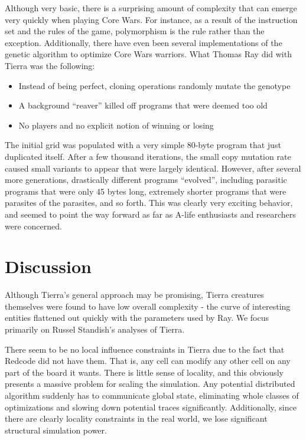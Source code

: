 \documentclass[11pt, twocolumn]{article}
\begin{document}
	Although very basic, there is a surprising amount of complexity that can emerge very quickly when playing Core Wars. For instance, as a result of the instruction set and the rules of the game, polymorphism is the rule rather than the exception. Additionally, there have even been several implementations of the genetic algorithm to optimize Core Wars warriors. What Thomas Ray did with Tierra \cite{OnTierra} was the following: 

\begin{itemize}
\item Instead of being perfect, cloning operations randomly mutate the genotype
\item A background ``reaver'' killed off programs that were deemed too old
\item No players and no explicit notion of winning or losing
\end{itemize}

The initial grid was populated with a very simple 80-byte program that just duplicated itself. After a few thousand iterations, the small copy mutation rate caused small variants to appear that were largely identical.
However, after several more generations, drastically different programs ``evolved'', including parasitic programs that were only 45 bytes long, extremely shorter programs that were parasites of the parasites, and so forth. This was clearly very exciting behavior, and seemed to point the way forward as far as A-life enthusiasts and researchers were concerned.

\section{Discussion}
Although Tierra's general approach may be promising, Tierra creatures themselves were found to have low overall complexity - the curve of interesting entities flattened out quickly with the parameters used by Ray.  We focus primarily on Russel Standish's analyses of Tierra. \cite{Standish03open-endedartificial}

There seem to be no local influence constraints in Tierra due to the fact that Redcode did not have them. That is, any cell can modify any other cell on any part of the board it wants. There is little sense of locality, and this obviously presents a massive problem for scaling the simulation. Any potential distributed algorithm suddenly has to communicate global state, eliminating whole classes of optimizations and slowing down potential traces significantly. Additionally, since there are clearly locality constraints in the real world, we lose significant structural simulation power.
\end{document}
